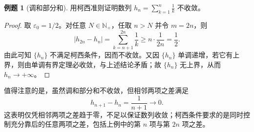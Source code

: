 \documentclass[UTF8, fontset=fandol, a4paper, 12pt]{ctexart}
\newcommand{\Nplus}{\mathbb N_{+}}
\theoremstyle{definition}
\newtheorem*{example}{例题}
\begin{document}
\begin{example}[调和部分和]
用柯西准则证明数列
$h_n=\displaystyle\sum_{k=1}^{n}\frac1k$ 不收敛。
\end{example}
\begin{proof}
取 $\varepsilon_0=1/2$。对任意 $N\in\Nplus$，任取 $n>N$ 并令 $m=2n$，则
\[
|h_{2n}-h_n|
=\sum_{k=n+1}^{2n}\frac1k
\ge n\cdot\frac1{2n}
=\frac12.
\]
由此可知 $\{h_n\}$ 不满足柯西条件，因而不收敛。又因 $\{h_n\}$ 单调递增，若它有上界，则由单调有界定理必收敛，与上述结论矛盾；故 $\{h_n\}$ 无上界，从而 $h_n\to+\infty$。
\end{proof}

值得注意的是，虽然调和部分和不收敛，但相邻两项之差满足
\[
h_{n+1}-h_n=\frac1{n+1}\longrightarrow0.
\]
这表明仅凭相邻两项之差趋于零，不足以保证数列收敛；柯西条件要求的是同时控制充分靠后的任意两项之差，包括上例中的第 $n$ 项与第 $2n$ 项之差。
\end{document}
